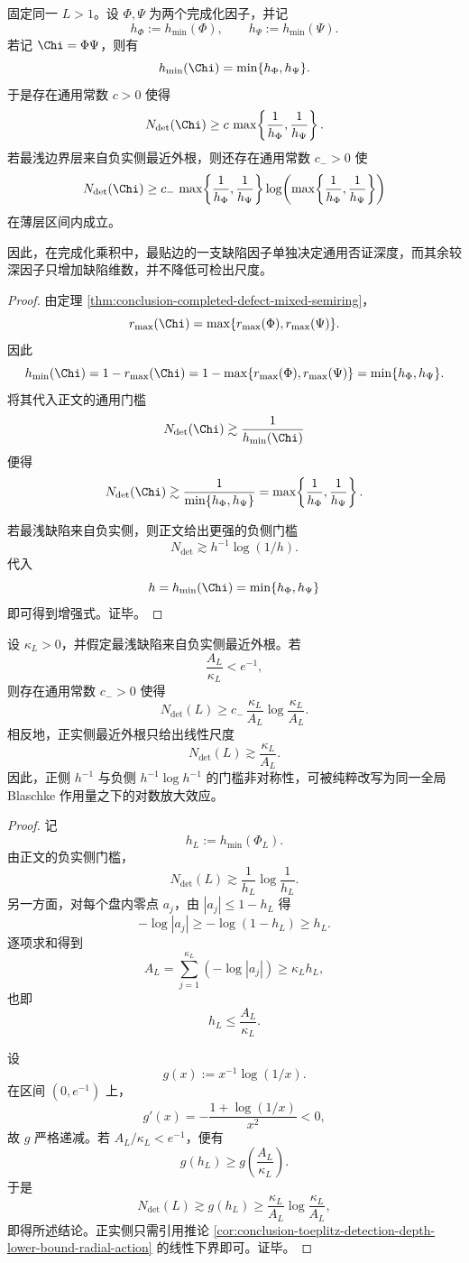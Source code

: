 \begin{theorem}[浅层因子主宰律]\label{thm:conclusion-shallow-factor-dominance-law}
固定同一 \(L>1\)。设 \(\Phi,\Psi\) 为两个完成化因子，并记
\[
h_\Phi:=h_{\min}(\Phi),
\qquad
h_\Psi:=h_{\min}(\Psi).
\]
若记 \(\Chi=\Phi\Psi\)，则有
\[
h_{\min}(\Chi)=\min\{h_\Phi,h_\Psi\}.
\]
于是存在通用常数 \(c>0\) 使得
\[
N_{\det}(\Chi)\ge c\,\max\!\left\{\frac{1}{h_\Phi},\frac{1}{h_\Psi}\right\}.
\]
若最浅边界层来自负实侧最近外根，则还存在通用常数 \(c_->0\) 使
\[
N_{\det}(\Chi)\ge
c_-\,
\max\!\left\{\frac{1}{h_\Phi},\frac{1}{h_\Psi}\right\}
\log\!\left(
\max\!\left\{\frac{1}{h_\Phi},\frac{1}{h_\Psi}\right\}
\right)
\]
在薄层区间内成立。

因此，在完成化乘积中，最贴边的一支缺陷因子单独决定通用否证深度，而其余较深因子只增加缺陷维数，并不降低可检出尺度。
\end{theorem}
\begin{proof}
由定理 \ref{thm:conclusion-completed-defect-mixed-semiring}，
\[
r_{\max}(\Chi)=\max\{r_{\max}(\Phi),r_{\max}(\Psi)\}.
\]
因此
\[
h_{\min}(\Chi)
=
1-r_{\max}(\Chi)
=
1-\max\{r_{\max}(\Phi),r_{\max}(\Psi)\}
=
\min\{h_\Phi,h_\Psi\}.
\]
将其代入正文的通用门槛
\[
N_{\det}(\Chi)\gtrsim \frac{1}{h_{\min}(\Chi)}
\]
便得
\[
N_{\det}(\Chi)\gtrsim
\frac{1}{\min\{h_\Phi,h_\Psi\}}
=
\max\!\left\{\frac{1}{h_\Phi},\frac{1}{h_\Psi}\right\}.
\]

若最浅缺陷来自负实侧，则正文给出更强的负侧门槛
\[
N_{\det}\gtrsim h^{-1}\log(1/h).
\]
代入
\[
h=h_{\min}(\Chi)=\min\{h_\Phi,h_\Psi\}
\]
即可得到增强式。证毕。
\end{proof}

\begin{theorem}[负实侧的对数放大律由全局作用量强制]\label{thm:conclusion-negative-side-log-amplification-global-action}
设 \(\kappa_L>0\)，并假定最浅缺陷来自负实侧最近外根。若
\[
\frac{A_L}{\kappa_L}<e^{-1},
\]
则存在通用常数 \(c_->0\) 使得
\[
N_{\det}(L)
\ge
c_-\,
\frac{\kappa_L}{A_L}
\log\frac{\kappa_L}{A_L}.
\]
相反地，正实侧最近外根只给出线性尺度
\[
N_{\det}(L)\gtrsim \frac{\kappa_L}{A_L}.
\]
因此，正侧 \(h^{-1}\) 与负侧 \(h^{-1}\log h^{-1}\) 的门槛非对称性，可被纯粹改写为同一全局 Blaschke 作用量之下的对数放大效应。
\end{theorem}
\begin{proof}
记
\[
h_L:=h_{\min}(\Phi_L).
\]
由正文的负实侧门槛，
\[
N_{\det}(L)\gtrsim \frac{1}{h_L}\log\frac{1}{h_L}.
\]
另一方面，对每个盘内零点 \(a_j\)，由 \(|a_j|\le 1-h_L\) 得
\[
-\log|a_j|
\ge
-\log(1-h_L)
\ge
h_L.
\]
逐项求和得到
\[
A_L=\sum_{j=1}^{\kappa_L}(-\log|a_j|)
\ge
\kappa_L h_L,
\]
也即
\[
h_L\le \frac{A_L}{\kappa_L}.
\]

设
\[
g(x):=x^{-1}\log(1/x).
\]
在区间 \((0,e^{-1})\) 上，
\[
g'(x)=-\frac{1+\log(1/x)}{x^2}<0,
\]
故 \(g\) 严格递减。若 \(A_L/\kappa_L<e^{-1}\)，便有
\[
g(h_L)\ge g\!\left(\frac{A_L}{\kappa_L}\right).
\]
于是
\[
N_{\det}(L)
\gtrsim
g(h_L)
\ge
\frac{\kappa_L}{A_L}\log\frac{\kappa_L}{A_L},
\]
即得所述结论。正实侧只需引用推论 \ref{cor:conclusion-toeplitz-detection-depth-lower-bound-radial-action} 的线性下界即可。证毕。
\end{proof}

